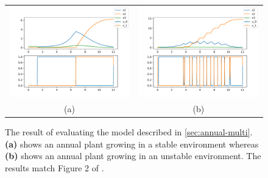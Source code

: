 \documentclass{article}
\begin{document}
\begin{figure}
  \centering
  \begin{tabular}{cc}
    \includegraphics[width=3in]{imgs/Mironchenko_figure2a.pdf} &
    \includegraphics[width=3in]{imgs/Mironchenko_figure2b.pdf} \\
    (a) & (b)
  \end{tabular}
  \caption{The result of evaluating the model described in \autoref{sec:annual-multi}. \textbf{(a)} shows an annual plant growing in a stable environment whereas \textbf{(b)} shows an annual plant growing in an unstable environment. The results match Figure 2 of \citep{mironchenko_optimal_2014}.\label{fig:mironchenko-fig2}}
\end{figure}

\end{document}
